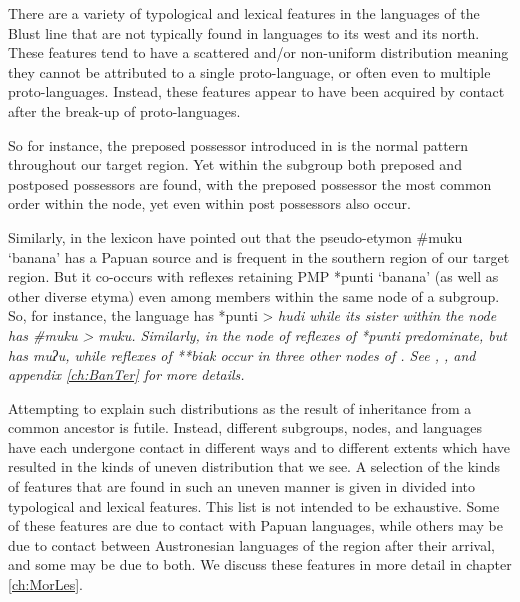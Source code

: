 There are a variety of typological and lexical features in the languages
 of the Blust line that are not typically found in languages to
its west and its north. These features tend to have a scattered
and/or non-uniform distribution meaning they cannot be attributed
to a single proto-language, or often even to multiple proto-languages.
Instead, these features appear to have been acquired by contact
after the break-up of proto-languages.

So for instance, the preposed possessor introduced in 
is the normal pattern throughout our target region.
Yet within the  subgroup both preposed
and postposed possessors are found, with the preposed possessor
the most common order within the  node,
yet even within  post possessors also occur.

Similarly, in the lexicon \citet{DenhamDonohue2009,DonohueDenham2009,Schapper2015}
have pointed out that the pseudo-etymon {\#}muku `banana'
has a Papuan source and is frequent in the southern region
of our target region. But it co-occurs with reflexes retaining PMP *punti `banana'
(as well as other diverse etyma) even among members within the same node of a subgroup.
So, for instance, the  language  has
*punti > \it{hudi} while its sister  within the 
node has {\#}muku > \it{muku}. Similarly, in the 
node of  reflexes of *punti predominate,
but  has \it{muʔu}, while reflexes of **biak occur in
three other nodes of .
See , , and appendix \ref{ch:BanTer}
for more details.

Attempting to explain such distributions as the result of inheritance
from a common ancestor is futile. Instead, different subgroups, nodes,
and languages have each undergone contact in different ways and to different
extents which have resulted in the kinds of uneven distribution that we see.
A selection of the kinds of features that are found in such an uneven manner
is given in  divided into typological and lexical features.
This list is not intended to be exhaustive.
Some of these features are due to contact with Papuan languages,
while others may be due to contact between Austronesian
languages of the region after their arrival, and some may be due to both.
We discuss these features in more detail in chapter \ref{ch:MorLes}.

